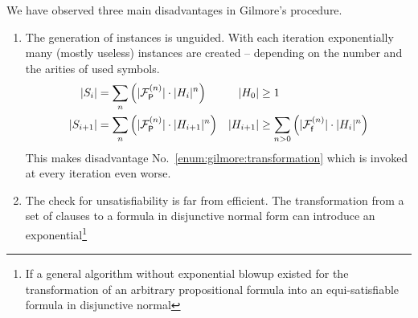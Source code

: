 We have observed three main disadvantages in Gilmore's procedure.
\begin{enumerate}
	\item\label{enum:gilmore:generation}
	 The generation of instances is unguided. 
	With each iteration exponentially many (mostly useless)
	instances are created
	-- depending on the number and the arities of used symbols.
\begin{align*}
	\lvert S_{i} \rvert &= \sum_n \left( \lvert {{\mathcal F}^{(n)}_{\mathsf P}} \rvert\cdot \lvert H_{i}\rvert^n \right)
	&
	\lvert H_0 \rvert &\geq 1	
	\\
	\lvert S_{i+1} \rvert &= \sum_n \left( \lvert {{\mathcal F}^{(n)}_{\mathsf P}} \rvert\cdot \lvert H_{i+1}\rvert^n \right)
	&
	\lvert H_{i+1}\rvert &\geq 
	\sum_{n>0}\left(
	\lvert{{\mathcal F}^{(n)}_{\mathsf f}}\rvert\cdot\lvert H_i \rvert^n
	\right) 
\end{align*}
		This makes disadvantage No.~\ref{enum:gilmore:transformation} 
		which is invoked at every iteration even worse.
	\item\label{enum:gilmore:transformation} 
	The check for unsatisfiability is far from efficient.
	The transformation from a set of clauses 
	to a formula in disjunctive normal form
	can introduce an exponential\footnote{
		If a general algorithm without exponential blowup existed 
		for the transformation of 
		an arbitrary propositional formula into 
		an equi-\allowbreak{}satisfiable formula in disjunctive normal 
}
\end{enumerate}
